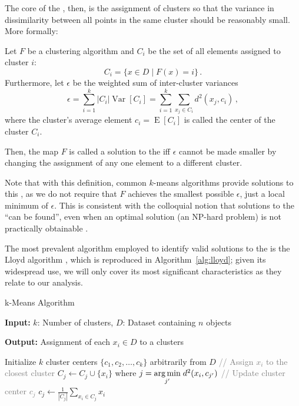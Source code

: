 The core of the \kmeans, then, is the assignment of clusters so that the variance in dissimilarity between all points in the same cluster should be reasonably small.
More formally:
\begin{definition}[\kmeans]
	Let $F$ be a clustering algorithm
	and $C_i$ be the set of all elements assigned to cluster $i$:
	$$ C_i = \{x \in D \mid F(x) = i\} \,.$$
	Furthermore, let $\epsilon$ be the weighted sum of inter-cluster variances
	$$ \epsilon = \sum_{i=1}^k |C_i| \operatorname{Var}[C_i] = \sum_{i=1}^k \sum_{x_j \in C_i}  d^2(x_j, c_i)\,, $$
	where the cluster's average element $c_i = \operatorname{E}[C_i]$ is called the center of the cluster $C_i$.

	Then, the map $F$ is called a solution to the \kmeans
	iff $\epsilon$ cannot be made smaller by changing the assignment of any one element to a different cluster.
\end{definition}
Note that with this definition, common $k$-means algorithms provide solutions to this \kmeans,
as we do not require that $F$ achieves the smallest possible $\epsilon$,
just a local minimum of $\epsilon$.
This is consistent with the colloquial notion that solutions to the \kmeans ``can be found'',
even when an optimal solution (an NP-hard problem) is not practically obtainable \cite{han2012data}.

The most prevalent algorithm employed to identify valid solutions to the \kmeans is the Lloyd algorithm \cite{DBLP:journals/tit/Lloyd82}, which is reproduced in Algorithm~\ref{alg:lloyd};
given its widespread use, we will only cover its most significant characteristics as they relate to our analysis.

\begin{algorithm}[t]
	\caption{k-Means Algorithm}
	\label{alg:lloyd}

	\textbf{Input:} \( k \): Number of clusters, \( D \): Dataset containing \( n \) objects

	\textbf{Output:} Assignment of each $x_i \in D$ to a clusters

	\begin{algorithmic}[1]
		\State Initialize \( k \) cluster centers \( \{c_1, c_2, \dots, c_k\} \) arbitrarily from \( D \)
		\Repeat
		\State \textcolor{gray}{// Assign \( x_i \) to the closest cluster}
		\label{algstep:assign}
		\State \( C_j \leftarrow C_j \cup \{x_i\} \) where \( j = \underset{j'}{\operatorname*{arg\,min}} \; d^2(x_i, c_{j'}) \)
		\EndFor
		\State \textcolor{gray}{// Update cluster center \( c_j \)}
		\State \( c_j \leftarrow \frac{1}{|C_j|} \sum_{x_i \in C_j} x_i \)
		\EndFor
	\end{algorithmic}
\end{algorithm}

